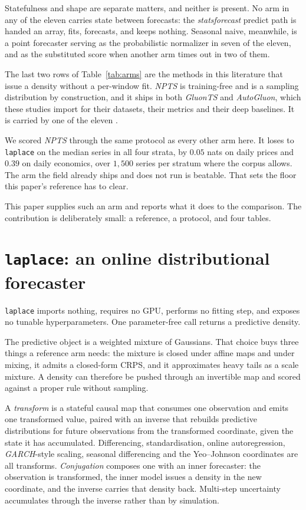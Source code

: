\documentclass[article]{jss}
\providecommand{\pkg}[1]{\textit{#1}}
\renewcommand{\pkg}[1]{\textit{#1}}
\providecommand{\code}[1]{\texttt{#1}}
\begin{document}
Statefulness and shape are separate matters, and neither is present. No arm in
any of the eleven carries state between forecasts: the \pkg{statsforecast}
predict path is handed an array, fits, forecasts, and keeps nothing. Seasonal
naive, meanwhile, is a point forecaster serving as the probabilistic normalizer
in seven of the eleven, and as the substituted score when another arm times out
in two of them.

The last two rows of Table~\ref{tab:arms} are the methods in this literature
that issue a density without a per-window fit. \pkg{NPTS} is training-free and is a
sampling distribution by construction, and it ships in both \pkg{GluonTS} and
\pkg{AutoGluon}, which these studies import for their datasets, their metrics
and their deep baselines. It is carried by one of the eleven
\citep{rasul2023lagllama}.

We scored \pkg{NPTS} through the same protocol as every other arm here. It
loses to \code{laplace} on the median series in all four strata, by $0.05$ nats
on daily prices and $0.39$ on daily economics, over $1{,}500$ series per stratum
where the corpus allows. The arm the field already ships and does not run is
beatable. That sets the floor this paper's reference has to clear.

This paper supplies such an arm and reports what it does to the comparison. The
contribution is deliberately small: a reference, a protocol, and four tables.

\section{\code{laplace}: an online distributional forecaster}\label{sec:reference}

\code{laplace} imports nothing, requires no GPU, performs no fitting step, and
exposes no tunable hyperparameters. One parameter-free call returns a predictive
density.

The predictive object is a weighted mixture of Gaussians. That choice buys
three things a reference arm needs: the mixture is closed under affine maps and
under mixing, it admits a closed-form CRPS, and it approximates heavy tails as a
scale mixture. A density can therefore be pushed through an invertible map and
scored against a proper rule \citep{gneiting2007strictly} without sampling.

A \emph{transform} is a stateful causal map that consumes one observation and
emits one transformed value, paired with an inverse that rebuilds predictive
distributions for future observations from the transformed coordinate, given the
state it has accumulated. Differencing, standardisation, online autoregression,
\pkg{GARCH}-style scaling, seasonal differencing and the Yeo--Johnson
coordinates are all transforms. \emph{Conjugation} composes one with an inner
forecaster: the observation is transformed, the inner model issues a density in
the new coordinate, and the inverse carries that density back. Multi-step
uncertainty accumulates through the inverse rather than by simulation.
\end{document}

